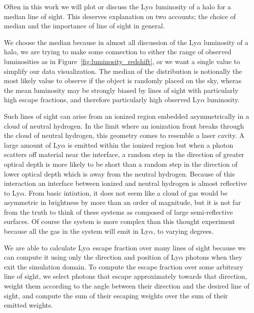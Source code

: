 Often in this work we will plot or discuss the Ly$\alpha$ luminosity of a halo for a median line of sight.
This deserves explanation on two accounts; the choice of median and the importance of line of sight in general.

We choose the median because in almost all discussion of the Ly$\alpha$ luminosity of a halo, we are trying to make some connection to either the range of observed luminosities as in Figure~\ref{fig:luminosity_redshift}, or we want a single value to simplify our data visualization.
The median of the distribution is notionally the most likely value to observe if the object is randomly placed on the sky, wheras the mean luminosity may be strongly biased by lines of sight with particularly high escape fractions, and therefore particularly high observed Ly$\alpha$ luminosity.

Such lines of sight can arise from an ionized region embedded asymmetrically in a cloud of neutral hydrogen.
In the limit where an ionization front breaks through the cloud of neutral hydrogen, this geometry comes to resemble a laser cavity.
A large amount of Ly$\alpha$ is emitted within the ionized region but when a photon scatters off material near the interface, a random step in the direction of greater optical depth is more likely to be short than a random step in the direction of lower optical depth which is away from the neutral hydrogen.
Because of this interaction an interface between ionized and neutral hydrogen is almost reflective to Ly$\alpha$.
From basic intiution, it does not seem like a cloud of gas would be asymmetric in brightness by more than an order of magnitude, but it is not far from the truth to think of these systems as composed of large semi-reflective surfaces.
Of course the system is more complex than this thought experiment because all the gas in the system will emit in Ly$\alpha$, to varying degrees.

We are able to calculate Ly$\alpha$ escape fraction over many lines of sight because we can compute it using only the direction and position of Ly$\alpha$ photons when they exit the simulation domain.
To compute the escape fraction over some arbitrary line of sight, we select photons that escape approximately towards that direction, weight them according to the angle between their direction and the desired line of sight, and compute the sum of their escaping weights over the sum of their emitted weights.

